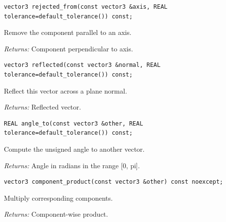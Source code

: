 \par\noindent\begin{minipage}{\linewidth}
\begin{lstlisting}[style=apireference]
vector3 rejected_from(const vector3 &axis, REAL tolerance=default_tolerance()) const;
\end{lstlisting}
{\footnotesize Remove the component parallel to an axis.\par}
{\footnotesize\textit{Returns:} Component perpendicular to axis.\par}
\end{minipage}\par\vspace{1pt}
\par\noindent\begin{minipage}{\linewidth}
\begin{lstlisting}[style=apireference]
vector3 reflected(const vector3 &normal, REAL tolerance=default_tolerance()) const;
\end{lstlisting}
{\footnotesize Reflect this vector across a plane normal.\par}
{\footnotesize\textit{Returns:} Reflected vector.\par}
\end{minipage}\par\vspace{1pt}
\par\noindent\begin{minipage}{\linewidth}
\begin{lstlisting}[style=apireference]
REAL angle_to(const vector3 &other, REAL tolerance=default_tolerance()) const;
\end{lstlisting}
{\footnotesize Compute the unsigned angle to another vector.\par}
{\footnotesize\textit{Returns:} Angle in radians in the range [0, pi].\par}
\end{minipage}\par\vspace{1pt}
\par\noindent\begin{minipage}{\linewidth}
\begin{lstlisting}[style=apireference]
vector3 component_product(const vector3 &other) const noexcept;
\end{lstlisting}
{\footnotesize Multiply corresponding components.\par}
{\footnotesize\textit{Returns:} Component-wise product.\par}
\end{minipage}\par\vspace{1pt}
